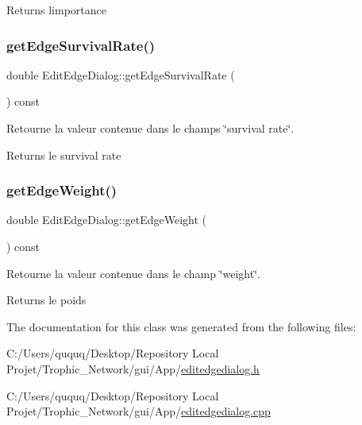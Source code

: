 \begin{DoxyReturn}{Returns}
l\textquotesingle{}importance 
\end{DoxyReturn}
\mbox{\label{class_edit_edge_dialog_a211adaab8e8221e69cbc8e3e3f19f83a}} 
\subsubsection{\texorpdfstring{get\+Edge\+Survival\+Rate()}{getEdgeSurvivalRate()}}
{\footnotesize\ttfamily double Edit\+Edge\+Dialog\+::get\+Edge\+Survival\+Rate (\begin{DoxyParamCaption}{ }\end{DoxyParamCaption}) const}



Retourne la valeur contenue dans le champs \char`\"{}survival rate\char`\"{}. 

\begin{DoxyReturn}{Returns}
le survival rate 
\end{DoxyReturn}
\mbox{\label{class_edit_edge_dialog_a0342c98517f14a49fd2f40d01e400154}} 
\subsubsection{\texorpdfstring{get\+Edge\+Weight()}{getEdgeWeight()}}
{\footnotesize\ttfamily double Edit\+Edge\+Dialog\+::get\+Edge\+Weight (\begin{DoxyParamCaption}{ }\end{DoxyParamCaption}) const}



Retourne la valeur contenue dans le champ \char`\"{}weight\char`\"{}. 

\begin{DoxyReturn}{Returns}
le poids 
\end{DoxyReturn}


The documentation for this class was generated from the following files\+:\begin{DoxyCompactItemize}
\item 
C\+:/\+Users/ququq/\+Desktop/\+Repository Local Projet/\+Trophic\+\_\+\+Network/gui/\+App/\mbox{\hyperlink{editedgedialog_8h}{editedgedialog.\+h}}\item 
C\+:/\+Users/ququq/\+Desktop/\+Repository Local Projet/\+Trophic\+\_\+\+Network/gui/\+App/\mbox{\hyperlink{editedgedialog_8cpp}{editedgedialog.\+cpp}}\end{DoxyCompactItemize}
